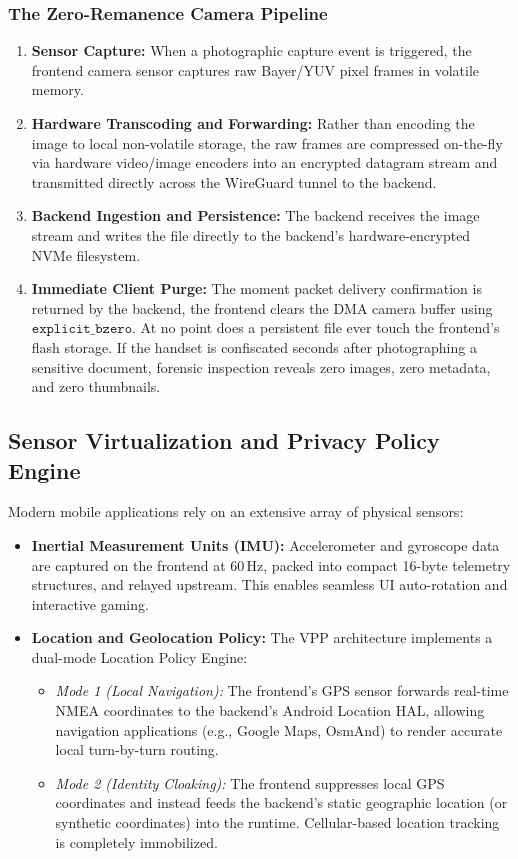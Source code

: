 \subsubsection{The Zero-Remanence Camera Pipeline}
\begin{enumerate}
    \item \textbf{Sensor Capture:} When a photographic capture event is triggered, the frontend camera sensor captures raw Bayer/YUV pixel frames in volatile memory.
    \item \textbf{Hardware Transcoding and Forwarding:} Rather than encoding the image to local non-volatile storage, the raw frames are compressed on-the-fly via hardware video/image encoders into an encrypted datagram stream and transmitted directly across the WireGuard tunnel to the backend.
    \item \textbf{Backend Ingestion and Persistence:} The backend receives the image stream and writes the file directly to the backend's hardware-encrypted NVMe filesystem.
    \item \textbf{Immediate Client Purge:} The moment packet delivery confirmation is returned by the backend, the frontend clears the DMA camera buffer using $\texttt{explicit\_bzero}$. At no point does a persistent file ever touch the frontend's flash storage. If the handset is confiscated seconds after photographing a sensitive document, forensic inspection reveals zero images, zero metadata, and zero thumbnails.
\end{enumerate}

\subsection{Sensor Virtualization and Privacy Policy Engine}
Modern mobile applications rely on an extensive array of physical sensors:
\begin{itemize}
    \item \textbf{Inertial Measurement Units (IMU):} Accelerometer and gyroscope data are captured on the frontend at 60\,Hz, packed into compact 16-byte telemetry structures, and relayed upstream. This enables seamless UI auto-rotation and interactive gaming.
    \item \textbf{Location and Geolocation Policy:} The VPP architecture implements a dual-mode Location Policy Engine:
    \begin{itemize}
        \item \textit{Mode 1 (Local Navigation):} The frontend's GPS sensor forwards real-time NMEA coordinates to the backend's Android Location HAL, allowing navigation applications (e.g., Google Maps, OsmAnd) to render accurate local turn-by-turn routing.
        \item \textit{Mode 2 (Identity Cloaking):} The frontend suppresses local GPS coordinates and instead feeds the backend's static geographic location (or synthetic coordinates) into the runtime. Cellular-based location tracking is completely immobilized.
    \end{itemize}
\end{itemize}

